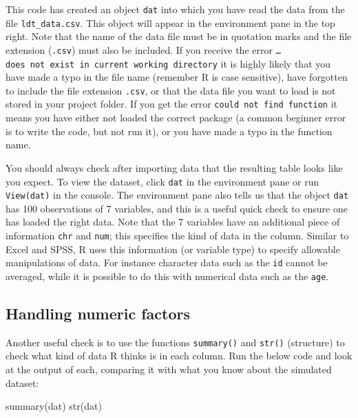 \documentclass[
  english,
  doc,floatsintext]{apa6}
\newenvironment{Shaded}{\begin{snugshade}}{\end{snugshade}}
\newcommand{\FunctionTok}[1]{\textcolor[rgb]{0.00,0.00,0.00}{#1}}
\newcommand{\NormalTok}[1]{#1}
\begin{document}
This code has created an object \texttt{dat} into which you have read the data from the file \texttt{ldt\_data.csv}. This object will appear in the environment pane in the top right. Note that the name of the data file must be in quotation marks and the file extension (\texttt{.csv}) must also be included. If you receive the error \texttt{\ldots{}does\ not\ exist\ in\ current\ working\ directory} it is highly likely that you have made a typo in the file name (remember R is case sensitive), have forgotten to include the file extension \texttt{.csv}, or that the data file you want to load is not stored in your project folder. If you get the error \texttt{could\ not\ find\ function} it means you have either not loaded the correct package (a common beginner error is to write the code, but not run it), or you have made a typo in the function name.

You should always check after importing data that the resulting table looks like you expect. To view the dataset, click \texttt{dat} in the environment pane or run \texttt{View(dat)} in the console. The environment pane also tells us that the object \texttt{dat} has 100 observations of 7 variables, and this is a useful quick check to ensure one has loaded the right data. Note that the 7 variables have an additional piece of information \texttt{chr} and \texttt{num}; this specifies the kind of data in the column. Similar to Excel and SPSS, R uses this information (or variable type) to specify allowable manipulations of data. For instance character data such as the \texttt{id} cannot be averaged, while it is possible to do this with numerical data such as the \texttt{age}.

\hypertarget{handling-numeric-factors}{%
\subsection{Handling numeric factors}\label{handling-numeric-factors}}

Another useful check is to use the functions \texttt{summary()} and \texttt{str()} (structure) to check what kind of data R thinks is in each column. Run the below code and look at the output of each, comparing it with what you know about the simulated dataset:

\begin{Shaded}
\begin{Highlighting}[]
\FunctionTok{summary}\NormalTok{(dat)}
\FunctionTok{str}\NormalTok{(dat)}
\end{Highlighting}
\end{Shaded}
\end{document}
